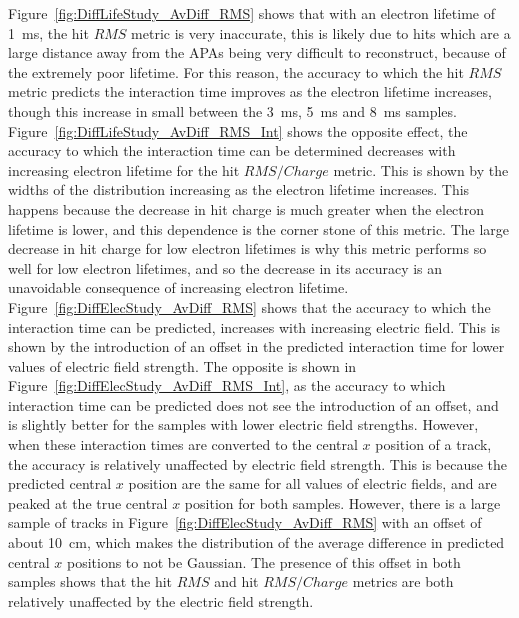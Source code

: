 Figure~\ref{fig:DiffLifeStudy_AvDiff_RMS} shows that with an electron lifetime of 1~ms, the hit $RMS$ metric is very inaccurate, this is likely due to hits which are a large distance away from the APAs being very difficult to reconstruct, because of the extremely poor lifetime. For this reason, the accuracy to which the hit $RMS$ metric predicts the interaction time improves as the electron lifetime increases, though this increase in small between the 3~ms, 5~ms and 8~ms samples. Figure~\ref{fig:DiffLifeStudy_AvDiff_RMS_Int} shows the opposite effect, the accuracy to which the interaction time can be determined decreases with increasing electron lifetime for the hit $RMS/Charge$ metric. This is shown by the widths of the distribution increasing as the electron lifetime increases. This happens because the decrease in hit charge is much greater when the electron lifetime is lower, and this dependence is the corner stone of this metric. The large decrease in hit charge for low electron lifetimes is why this metric performs so well for low electron lifetimes, and so the decrease in its accuracy is an unavoidable consequence of increasing electron lifetime. \\

Figure~\ref{fig:DiffElecStudy_AvDiff_RMS} shows that the accuracy to which the interaction time can be predicted, increases with increasing electric field. This is shown by the introduction of an offset in the predicted interaction time for lower values of electric field strength. The opposite is shown in Figure~\ref{fig:DiffElecStudy_AvDiff_RMS_Int}, as the accuracy to which interaction time can be predicted does not see the introduction of an offset, and is slightly better for the samples with lower electric field strengths. However, when these interaction times are converted to the central $x$ position of a track, the accuracy is relatively unaffected by electric field strength. This is because the predicted central $x$ position are the same for all values of electric fields, and are peaked at the true central $x$ position for both samples. However, there is a large sample of tracks in Figure~\ref{fig:DiffElecStudy_AvDiff_RMS} with an offset of about 10~cm, which makes the distribution of the average difference in predicted central $x$ positions to not be Gaussian. The presence of this offset in both samples shows that the hit $RMS$ and hit $RMS/Charge$ metrics are both relatively unaffected by the electric field strength. \\

